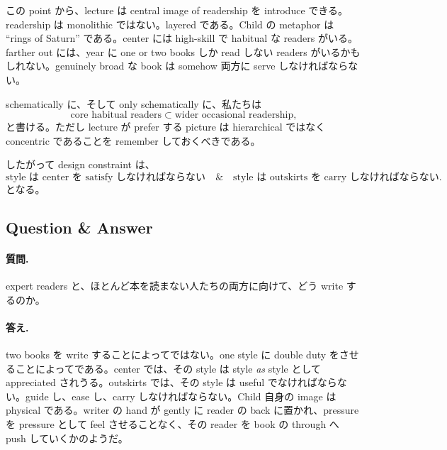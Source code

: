 この point から、lecture は central image of readership を introduce できる。readership は monolithic ではない。layered である。Child の metaphor は ``rings of Saturn'' である。center には high-skill で habitual な readers がいる。farther out には、year に one or two books しか read しない readers がいるかもしれない。genuinely broad な book は somehow 両方に serve しなければならない。

schematically に、そして only schematically に、私たちは
\begin{equation}
\text{core habitual readers} \subset \text{wider occasional readership},
\end{equation}
と書ける。ただし lecture が prefer する picture は hierarchical ではなく concentric であることを remember しておくべきである。

\begin{figure}[h]
\centering
{}
\end{figure}

したがって design constraint は、
\begin{equation}
\text{style は center を satisfy しなければならない} \quad \& \quad \text{style は outskirts を carry しなければならない}.
\end{equation}
となる。

\subsection{Question \& Answer}

\paragraph{質問.} expert readers と、ほとんど本を読まない人たちの両方に向けて、どう write するのか。

\paragraph{答え.} two books を write することによってではない。one style に double duty をさせることによってである。center では、その style は style \emph{as} style として appreciated されうる。outskirts では、その style は useful でなければならない。guide し、ease し、carry しなければならない。Child 自身の image は physical である。writer の hand が gently に reader の back に置かれ、pressure を pressure として feel させることなく、その reader を book の through へ push していくかのようだ。

